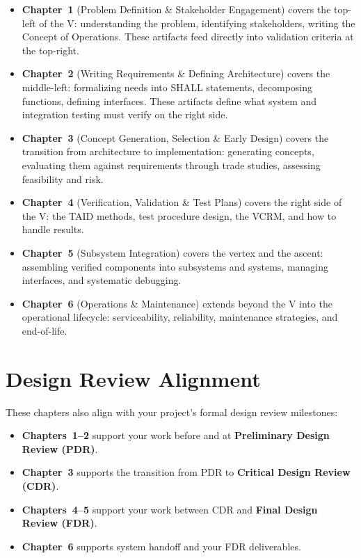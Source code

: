 \documentclass[11pt,letterpaper,twoside,openany]{book}
\begin{document}
\begin{itemize}[nosep,leftmargin=1.5em]
\item \textbf{Chapter~1} (Problem Definition \& Stakeholder Engagement) covers the top-left of the V: understanding the problem, identifying stakeholders, writing the Concept of Operations. These artifacts feed directly into validation criteria at the top-right.
\item \textbf{Chapter~2} (Writing Requirements \& Defining Architecture) covers the middle-left: formalizing needs into SHALL statements, decomposing functions, defining interfaces. These artifacts define what system and integration testing must verify on the right side.
\item \textbf{Chapter~3} (Concept Generation, Selection \& Early Design) covers the transition from architecture to implementation: generating concepts, evaluating them against requirements through trade studies, assessing feasibility and risk.
\item \textbf{Chapter~4} (Verification, Validation \& Test Plans) covers the right side of the V: the TAID methods, test procedure design, the VCRM, and how to handle results.
\item \textbf{Chapter~5} (Subsystem Integration) covers the vertex and the ascent: assembling verified components into subsystems and systems, managing interfaces, and systematic debugging.
\item \textbf{Chapter~6} (Operations \& Maintenance) extends beyond the V into the operational lifecycle: serviceability, reliability, maintenance strategies, and end-of-life.
\end{itemize}

\section*{Design Review Alignment}

These chapters also align with your project's formal design review milestones:

\begin{itemize}[nosep,leftmargin=1.5em]
\item \textbf{Chapters~1--2} support your work before and at \textbf{Preliminary Design Review (PDR)}.
\item \textbf{Chapter~3} supports the transition from PDR to \textbf{Critical Design Review (CDR)}.
\item \textbf{Chapters~4--5} support your work between CDR and \textbf{Final Design Review (FDR)}.
\item \textbf{Chapter~6} supports system handoff and your FDR deliverables.
\end{itemize}
\end{document}
